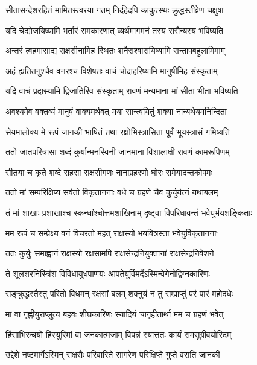 \twolineshloka
{सीतासन्देशरहितं मामितस्त्वरया गतम्}
{निर्दहेदपि काकुत्स्थः क्रुद्धस्तीव्रेण चक्षुषा} %

\twolineshloka
{यदि चेद्योजयिष्यामि भर्तारं रामकारणात्}
{व्यर्थमागमनं तस्य ससैन्यस्य भविष्यति} %

\twolineshloka
{अन्तरं त्वहमासाद्य राक्षसीनामिह स्थितः}
{शनैराश्वासयिष्यामि सन्तापबहुलामिमाम्} %

\twolineshloka
{अहं ह्यतितनुश्चैव वनरश्च विशेषतः}
{वाचं चोदाहरिष्यामि मानुषीमिह संस्कृताम्} %

\twolineshloka
{यदि वाचं प्रदास्यामि द्विजातिरिव संस्कृताम्}
{रावणं मन्यमाना मां सीता भीता भविष्यति} %

\twolineshloka
{अवश्यमेव वक्तव्यं मानुषं वाक्यमर्थवत्}
{मया सान्त्वयितुं शक्या नान्यथेयमनिन्दिता} %

\twolineshloka
{सेयमालोक्य मे रूपं जानकी भाषितं तथा}
{रक्षोभिस्त्रासिता पूर्वं भूयस्त्रासं गमिष्यति} %

\twolineshloka
{ततो जातपरित्रासा शब्दं कुर्यान्मनस्विनी}
{जानमाना विशालाक्षी रावणं कामरूपिणम्} %

\twolineshloka
{सीतया च कृते शब्दे सहसा राक्षसीगणः}
{नानाप्रहरणो घोरः समेयादन्तकोपमः} %

\twolineshloka
{ततो मां सम्परिक्षिप्य सर्वतो विकृताननाः}
{वधे च ग्रहणे चैव कुर्युर्यत्नं यथाबलम्} %

\twolineshloka
{तं मां शाखाः प्रशाखाश्च स्कन्धांश्चोत्तमशाखिनाम्}
{दृष्ट्वा विपरिधावन्तं भवेयुर्भयशङ्किताः} %

\twolineshloka
{मम रूपं च सम्प्रेक्ष्य वनं विचरतो महत्}
{राक्षस्यो भयवित्रस्ता भवेयुर्विकृताननाः} %

\twolineshloka
{ततः कुर्युः समाह्वानं राक्षस्यो रक्षसामपि}
{राक्षसेन्द्रनियुक्तानां राक्षसेन्द्रनिवेशने} %

\twolineshloka
{ते शूलशरनिस्त्रिंश विविधायुधपाणयः}
{आपतेयुर्विमर्देऽस्मिन्वेगेनोद्विग्नकारिणः} %

\twolineshloka
{सङ्क्रुद्धस्तैस्तु परितो विधमन् रक्षसां बलम्}
{शक्नुयं न तु सम्प्राप्तुं परं पारं महोदधेः} %

\twolineshloka
{मां वा गृह्णीयुराप्लुत्य बहवः शीघ्रकारिणः}
{स्यादियं चागृहीतार्था मम च ग्रहणं भवेत्} %

\twolineshloka
{हिंसाभिरुचयो हिंस्युरिमां वा जनकात्मजाम्}
{विपन्नं स्यात्ततः कार्यं रामसुग्रीवयोरिदम्} %

\twolineshloka
{उद्देशे नष्टमार्गेऽस्मिन् राक्षसैः परिवारिते}
{सागरेण परिक्षिप्ते गुप्ते वसति जानकी} %

